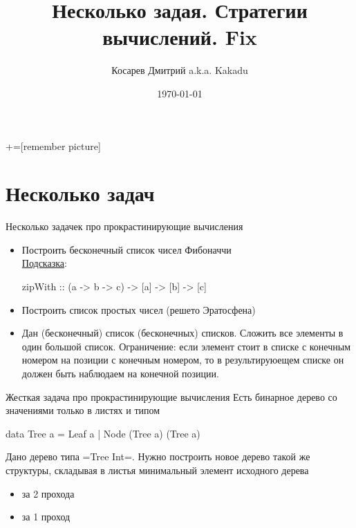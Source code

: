 \documentclass[
  xcolor={svgnames},
  hyperref={colorlinks,citecolor=DeepPink4,linkcolor=DarkRed,urlcolor=DarkBlue}]{beamer}
\title[Занятие 3]{Несколько задая. Стратегии вычислений. Fix}
\author{Косарев Дмитрий a.k.a. Kakadu}
\institute{матмех СПбГУ}
\date{\today}
\begin{document}
\maketitle

+=[remember picture]

\everymath{\displaystyle}


\section{Несколько задач}

\begin{frame}[fragile]{Несколько задачек про прокрастинирующие вычисления}
\begin{itemize}
 \item Построить бесконечный список чисел Фибоначчи \\ \href{https://www.haskell.org/hoogle/?hoogle=zipWith}{Подсказка}:\vspace{0.5cm}
 \begin{verbnobox}[\monacoB]
zipWith :: (a -> b -> c) -> [a] -> [b] -> [c]
 \end{verbnobox}
 \item Построить список простых чисел (решето Эратосфена)
 \item Дан (бесконечный) список (бесконечных) списков. Сложить все элементы в один большой список. Ограничение: если элемент стоит в списке с конечным номером на позиции с конечным номером, то в результируюещем списке он должен быть наблюдаем на конечной позиции.
\end{itemize}

\end{frame}

\begin{frame}[fragile]{Жесткая задача про прокрастинирующие вычисления}
Есть бинарное дерево со значениями только в листях и типом \pause
\begin{verbnobox}[\monacoB] 
data Tree a = Leaf a
            | Node (Tree a) (Tree a)
\end{verbnobox}
Дано дерево типа \hsinline=Tree Int=. Нужно построить новое дерево такой же структуры, складывая в листья минимальный элемент исходного дерева
\begin{itemize}
 \item за 2 прохода
 \item за 1 проход
\end{itemize}
\end{frame}
\end{document}
